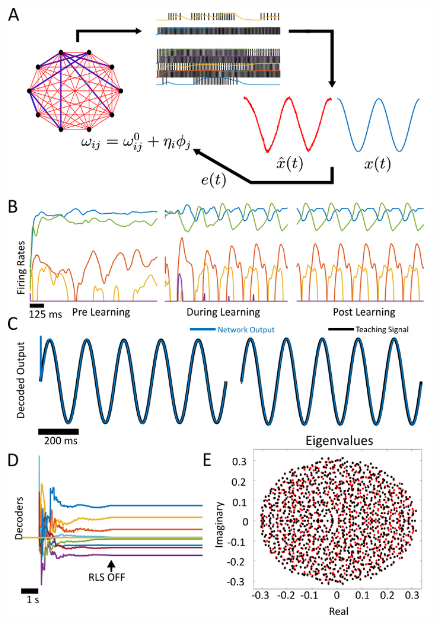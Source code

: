 \documentclass[11pt]{article} %
\begin{document}
\newpage

\begin{figure}[htp!]
\centering 
\end{figure}


\begin{figure}[htp!]
\centering
\includegraphics[scale=0.8]{FFIG1}
\caption{}\label{FORCE1}
\end{figure}
\end{document}
